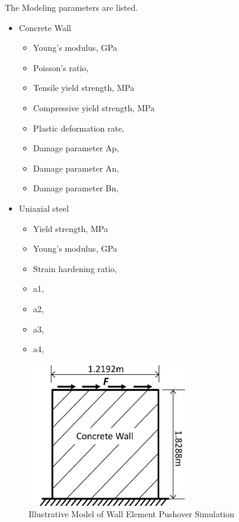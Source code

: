 The Modeling parameters are listed.
\begin{itemize}
  \item Concrete  Wall
  \begin{itemize}
    \item Young's modulus, \enspace {} GPa
    \item Poisson's ratio, \enspace {}
    \item Tensile yield strength, \enspace {} MPa
    \item Compressive yield strength, \enspace {} MPa
    \item Plastic deformation rate, \enspace {}
    \item Damage parameter Ap, \enspace {}
    \item Damage parameter An, \enspace {}
    \item Damage parameter Bn, \enspace {}
  \end{itemize}
  \item Uniaxial steel
  \begin{itemize}
    \item Yield strength, \enspace {} MPa
    \item Young's modulus, \enspace {} GPa
    \item Strain hardening ratio, \enspace {}
    \item a1, \enspace {}
    \item a2, \enspace {}
    \item a3, \enspace {}
    \item a4, \enspace {}
  \end{itemize}
\end{itemize}


\begin{figure}[H]
  \centering
  \includegraphics[width = 7cm]{./Figure-files/Day3/Wall_Pushover/overview.pdf}
  \caption{Illustrative Model of Wall Element Pushover Simulation }
  \label{fig_frame_pushover_wall}
\end{figure}



